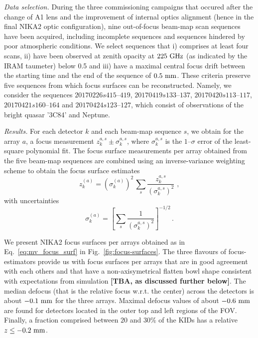 \emph{Data selection. }
During the three commissioning campaigns that occured after the change of A1
lens and the improvement of internal optics alignment (hence in the
final NIKA2 optic configuration),
nine out-of-focus
beam-map scan sequences have been acquired, including incomplete
sequences and sequences hindered by poor atmospheric conditions. We
select sequences that i) comprises at least four scans, ii) have been
observed at zenith opacity at $225~\rm{GHz}$ (as indicated by
the IRAM taumeter) below 0.5 and iii) have a maximal central focus
drift between the starting time and the end of the sequence of
$0.5~\rm{mm}$. These criteria preserve five sequences from which focus
surfaces can be reconstructed. Namely, we consider the sequences
$20170226s415\mbox{--}419$, $20170419s133\mbox{--}137$, $20170420s113\mbox{--}117$,
$20170421s160\mbox{--}164$ and $20170424s123\mbox{--}127$, which consist of observations
of the bright quasar '3C84' and Neptune.

\emph{Results. }
For each detector $k$ and each beam-map sequence $s$, we obtain for
the array $a$, a focus measurement $z_k^{a, s} \pm \sigma_k^{a, s}$,
where $\sigma_k^{a, s}$ is the $1\mbox{--}\sigma$ error of the least-square
polynomial fit. The focus surface measurements per array obtained from the five
beam-map sequences are combined using an inverse-variance weighting
scheme to obtain the focus surface estimates 
\begin{equation}
\label{eq:mv_focus_surf}
z_k^{(a)} = \left( \sigma_k^{(a)} \right)^2 \,  \sum_s \frac{z_k^{a,s}}{\left(\sigma_k^{a,s}\right)^2}\, \,  ,
\end{equation}
with uncertainties 
\begin{equation}
\label{eq:error_mv_focus_surf}
\sigma_k^{(a)} = \left[ \sum_s \frac{1}{\left(\sigma_k^{a,s}\right)^2}\right]^{-1/2}\, .
\end{equation}


We present NIKA2 focus surfaces per arrays obtained as in
Eq.~\ref{eq:mv_focus_surf} 
in Fig.~\ref{fig:focus-surfaces}.
The three flavours of focus-estimators provide us with focus surfaces
per arrays that are in good agreement with each others and that have a
non-axisymetrical flatten bowl shape consistent with expectations from
simulation {\bf [TBA, as discussed further below]}.
The median defocus (that is the relative focus w.r.t. the center)
across the detectors is about
$-0.1~\rm{mm}$ for the three arrays. Maximal defocus values of about
$-0.6~\rm{mm}$ are found for detectors located in the outer top and
left regions of the FOV. Finally, a fraction comprised between $20$
and $30\%$ of the KIDs has a relative $z\le -0.2~\rm{mm}$.  


